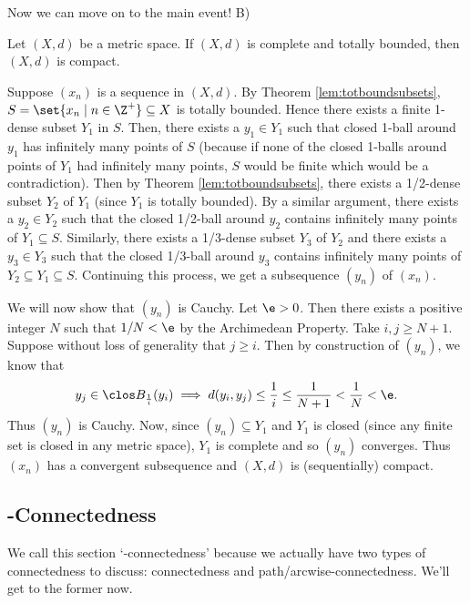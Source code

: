 \documentclass[class=article, crop=false]{standalone}
\begin{document}
Now we can move on to the main event! B)
\begin{thm}
    Let $(X,d)$ be a metric space. If $(X,d)$ is complete and totally bounded, then $(X,d)$ is compact.
\end{thm}
\begin{pf}
    Suppose $(x_n)$ is a sequence in $(X,d)$. By Theorem \ref{lem:totboundsubsets}, $S = \set{x_n \mid n \in \Z^+} \subseteq X$ is totally bounded. Hence there exists a finite 1-dense subset $Y_1$ in $S$. Then, there exists a $y_1 \in Y_1$ such that closed 1-ball around $y_1$ has infinitely many points of $S$ (because if none of the closed 1-balls around points of $Y_1$ had infinitely many points, $S$ would be finite which would be a contradiction). Then by Theorem \ref{lem:totboundsubsets}, there exists a 1/2-dense subset $Y_2$ of $Y_1$ (since $Y_1$ is totally bounded). By a similar argument, there exists a $y_2 \in Y_2$
   such that the closed 1/2-ball around $y_2$ contains infinitely many points of $Y_1 \subseteq S$. Similarly, there exists a 1/3-dense subset $Y_3$ of $Y_2$ and there exists a $y_3 \in Y_3$ such that the closed 1/3-ball around $y_3$ contains infinitely many points of $Y_2 \subseteq Y_1 \subseteq S$. Continuing this process, we get a subsequence $(y_n)$ of $(x_n)$.

   We will now show that $(y_n)$ is Cauchy. Let $\e > 0$. Then there exists a positive integer $N$ such that $1/N < \e$ by the Archimedean Property. Take $i,j \geq N+1$. Suppose without loss of generality that $j \geq i$. Then by construction of $(y_n)$, we know that
        \[
            y_j \in \clos B_{\frac{1}{i}}(y_i) \implies d(y_i,y_j) \leq \frac{1}{i} \leq \frac{1}{N+1} < \frac{1}{N} < \e.
        \]
   Thus $(y_n)$ is Cauchy. Now, since $(y_n) \subseteq Y_1$ and $Y_1$ is closed (since any finite set is closed in any metric space), $Y_1$ is complete and so $(y_n)$ converges. Thus $(x_n)$ has a convergent subsequence and $(X,d)$ is (sequentially) compact.
\end{pf}






\subsection{-Connectedness}

We call this section `-connectedness' because we actually have two types of connectedness to discuss: connectedness and path/arcwise-connectedness. We'll get to the former now.
\end{document}
